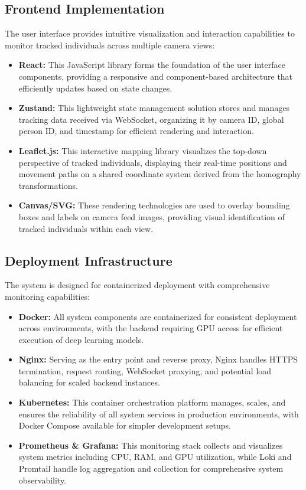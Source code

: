 \subsection{Frontend Implementation}
\label{subsection:frontend-implementation} %
The user interface provides intuitive visualization and interaction capabilities to monitor tracked individuals across multiple camera views:

\begin{itemize}[leftmargin=80pt]
    \item \textbf{React:} This JavaScript library forms the foundation of the user interface components, providing a responsive and component-based architecture that efficiently updates based on state changes.
    \item \textbf{Zustand:} This lightweight state management solution stores and manages tracking data received via WebSocket, organizing it by camera ID, global person ID, and timestamp for efficient rendering and interaction.
    \item \textbf{Leaflet.js:} This interactive mapping library visualizes the top-down perspective of tracked individuals, displaying their real-time positions and movement paths on a shared coordinate system derived from the homography transformations.
    \item \textbf{Canvas/SVG:} These rendering technologies are used to overlay bounding boxes and labels on camera feed images, providing visual identification of tracked individuals within each view.
\end{itemize}

\subsection{Deployment Infrastructure}
\label{subsection:deployment-infrastructure} %
The system is designed for containerized deployment with comprehensive monitoring capabilities:

\begin{itemize}[leftmargin=80pt]
    \item \textbf{Docker:} All system components are containerized for consistent deployment across environments, with the backend requiring GPU access for efficient execution of deep learning models.
    \item \textbf{Nginx:} Serving as the entry point and reverse proxy, Nginx handles HTTPS termination, request routing, WebSocket proxying, and potential load balancing for scaled backend instances.
    \item \textbf{Kubernetes:} This container orchestration platform manages, scales, and ensures the reliability of all system services in production environments, with Docker Compose available for simpler development setups.
    \item \textbf{Prometheus \& Grafana:} This monitoring stack collects and visualizes system metrics including CPU, RAM, and GPU utilization, while Loki and Promtail handle log aggregation and collection for comprehensive system observability.
\end{itemize}

